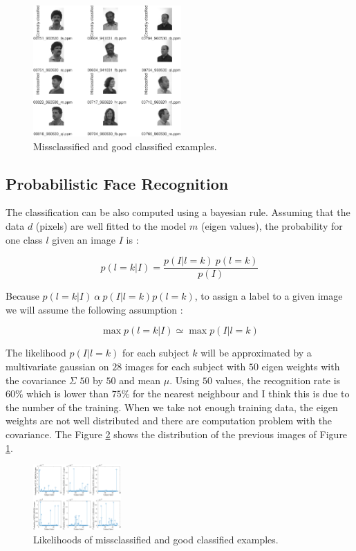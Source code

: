 \documentclass[runningheads,a4paper]{llncs}
\begin{document}
\begin{figure}
\centering
\includegraphics[height=5cm]{Figures/error_class_eig}
\caption{Missclassified and good classified examples.}
\label{fig:error_class_eig}
\end{figure}

\subsection{Probabilistic Face Recognition}

The classification can be also computed using a bayesian rule. Assuming that the data $d$ (pixels) are well fitted to the model $m$ (eigen values), the probability for one class $l$ given an image $I$ is :

\begin{equation}
p(l=k|I)=\frac{p(I|l=k)~p(l=k)}{p(I)}
\end{equation}

Because $p(l=k|I) ~\alpha~p(I|l=k)p(l=k)$, to assign a label to a given image we will assume the following assumption :

\begin{equation}
\max p(l=k|I) \simeq \max p(I|l=k)
\end{equation}

The likelihood $p(I|l=k)$ for each subject $k$ will be approximated by a multivariate gaussian on $28$ images for each subject with $50$ eigen weights with the covariance $\Sigma$ $50$ by $50$ and mean $\mu$. Using $50$ values, the recognition rate is $60\%$ which is lower than $75\%$ for the nearest neighbour and I think this is due to the number of the training. When we take not enough training data, the eigen weights are not well distributed and there are computation problem with the covariance. The Figure \ref{fig:proba_eig} shows the distribution of the previous images of Figure \ref{fig:error_class_eig}.

\begin{figure}
\centering
\includegraphics[height=2.5cm]{Figures/proba_eig}
\caption{Likelihoods of missclassified and good classified examples.}
\label{fig:proba_eig}
\end{figure}
\end{document}
